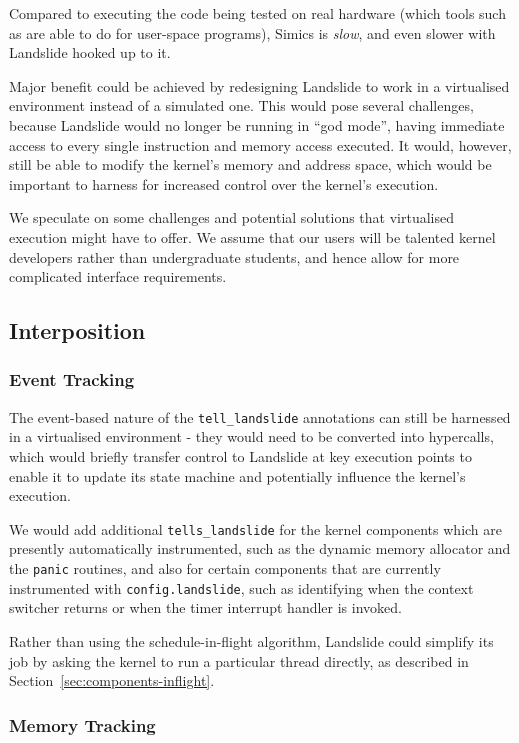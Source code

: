 Compared to executing the code being tested on real hardware (which tools such as \cite{dbug-ssv} are able to do for user-space programs), Simics is {\em slow}, and even slower with Landslide hooked up to it.

Major benefit could be achieved by redesigning Landslide to work in a virtualised environment instead of a simulated one. This would pose several challenges, because Landslide would no longer be running in ``god mode'', having immediate access to every single instruction and memory access executed. It would, however, still be able to modify the kernel's memory and address space, which would be important to harness for increased control over the kernel's execution.

We speculate on some challenges and potential solutions that virtualised execution might have to offer. We assume that our users will be talented kernel developers rather than undergraduate students, and hence allow for more complicated interface requirements.

\subsection{Interposition}

\subsubsection{Event Tracking}

The event-based nature of the \texttt{tell\_landslide} annotations can still be harnessed in a virtualised environment - they would need to be converted into hypercalls, which would briefly transfer control to Landslide at key execution points to enable it to update its state machine and potentially influence the kernel's execution.

We would add additional \texttt{tells\_landslide} for the kernel components which are presently automatically instrumented, such as the dynamic memory allocator and the \texttt{panic} routines, and also for certain components that are currently instrumented with \texttt{config.landslide}, such as identifying when the context switcher returns or when the timer interrupt handler is invoked.

Rather than using the schedule-in-flight algorithm, Landslide could simplify its job by asking the kernel to run a particular thread directly, as described in Section~\ref{sec:components-inflight}.

\subsubsection{Memory Tracking}

